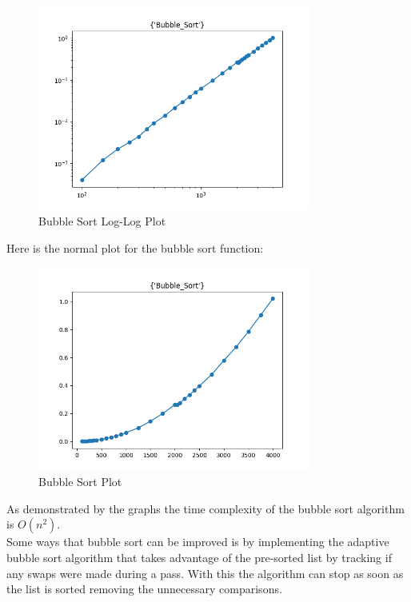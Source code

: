 \documentclass{article}
\begin{document}
\begin{figure}[H]
    \centering
    \includegraphics*[width=0.8\textwidth]{img/loglog_Bubble_Sort.png}
    \caption{Bubble Sort Log-Log Plot}
\end{figure}

Here is the normal plot for the bubble sort function:
\begin{figure}[H]
    \centering
    \includegraphics*[width=0.8\textwidth]{img/plot_Bubble_Sort.png}
    \caption{Bubble Sort Plot}
\end{figure}

As demonstrated by the graphs the time complexity of the bubble sort algorithm is $O(n^2)$. \\


Some ways that bubble sort can be improved is by implementing the adaptive bubble sort algorithm that takes advantage of the pre-sorted list by tracking if any swaps were made during a pass. With this the algorithm can stop as soon as the list is sorted removing the unnecessary comparisons.
\end{document}
